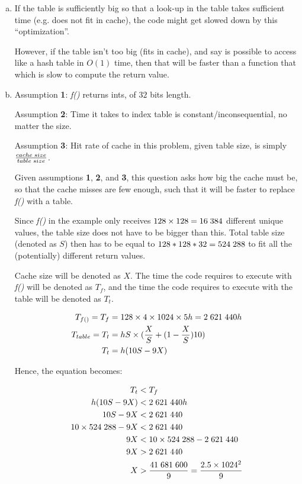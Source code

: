 \documentclass[fontsize=11pt, paper=a4, titlepage]{article}
\begin{document}
\begin{enumerate}[a)]

    \item If the table is sufficiently big so that a look-up in the table takes
sufficient time (e.g. does not fit in cache), the code might get slowed down by this ``optimization''.

However, if the table isn't too big (fits in cache), and say is possible to
access like a hash table in $O(1)$ time, then that will be faster than a
function that which is slow to compute the return value.

    \item Assumption \textbf{1}: \textit{f()} returns ints, of $32$ bits length.

Assumption \textbf{2}: Time it takes to index table is constant/inconsequential,
no matter the size.

Assumption \textbf{3}: Hit rate of cache in this problem,
given table size, is simply $\frac{cache\thickspace size}{table\thickspace size}$.

Given assumptions \textbf{1}, \textbf{2}, and \textbf{3}, this question asks how
big the cache must be, so that the cache misses are few enough, such that it
will be faster to replace \textit{f()} with a table.

Since \textit{f()} in the example only receives $128\times 128 = 16\thickspace
384$ different unique values, the table size does not have to be bigger than
this. Total table size (denoted as $S$) then has to be equal to $128*128*32 =
524\thickspace 288$ to fit all the (potentially) different return values.

Cache size will be denoted as $X$. The time the code requires to execute with
\textit{f()} will be denoted as $T_f$, and the time the code requires to execute
with the table will be denoted as $T_t$.

    \begin{align*}
        T_{f()} = T_f &= 128\times 4\times 1024\times 5h
        = 2\thickspace 621\thickspace 440h \\
        T_{table} = T_t &= hS\times(\frac{X}{S} + (1-\frac{X}{S})10)\\
        T_t &= h(10S- 9X)
    \end{align*}

Hence, the equation becomes:

    \begin{align*}
        T_t &< T_f \\
        h(10S-9X) &< 2\thickspace 621\thickspace 440h \\
        10S - 9X &< 2\thickspace 621\thickspace 440 \\
        10\times 524\thickspace 288 - 9X &< 2\thickspace 621\thickspace 440 \\
        9X &< 10\times 524\thickspace 288 - 2\thickspace 621\thickspace 440 \\
        9X &> 2\thickspace 621\thickspace 440 \\
        X &> \frac{41\thickspace 681\thickspace 600}{9} = \frac{2.5\times 1024^2}{9}
    \end{align*}


\end{enumerate}
\end{document}
